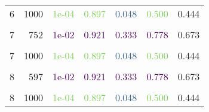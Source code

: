 \begin{table}
{\begin{tabular}[t]{rr>{}r>{}r>{}r>{}rr}
6 & 1000 & \textcolor[HTML]{7AD151}{1e-04} & \textcolor[HTML]{7AD151}{0.897} & \textcolor[HTML]{365C8D}{0.048} & \textcolor[HTML]{7AD151}{0.500} & 0.444\\
\cellcolor{gray!6}{7} & \cellcolor{gray!6}{158} & \textcolor[HTML]{443983}{\cellcolor{gray!6}{1e-01}} & \textcolor[HTML]{440154}{\cellcolor{gray!6}{0.916}} & \textcolor[HTML]{481F70}{\cellcolor{gray!6}{0.333}} & \textcolor[HTML]{46327E}{\cellcolor{gray!6}{0.700}} & \cellcolor{gray!6}{0.633}\\
7 & 752 & \textcolor[HTML]{440154}{1e-02} & \textcolor[HTML]{440154}{0.921} & \textcolor[HTML]{440154}{0.333} & \textcolor[HTML]{440154}{0.778} & 0.673\\
\cellcolor{gray!6}{7} & \cellcolor{gray!6}{1000} & \textcolor[HTML]{35B779}{\cellcolor{gray!6}{1e-03}} & \textcolor[HTML]{36B779}{\cellcolor{gray!6}{0.901}} & \textcolor[HTML]{482979}{\cellcolor{gray!6}{0.095}} & \textcolor[HTML]{24868E}{\cellcolor{gray!6}{0.667}} & \cellcolor{gray!6}{0.542}\\
7 & 1000 & \textcolor[HTML]{7AD151}{1e-04} & \textcolor[HTML]{7AD151}{0.897} & \textcolor[HTML]{365C8D}{0.048} & \textcolor[HTML]{7AD151}{0.500} & 0.444\\
\hline
\cellcolor{gray!6}{8} & \cellcolor{gray!6}{162} & \textcolor[HTML]{31688E}{\cellcolor{gray!6}{1e-01}} & \textcolor[HTML]{440154}{\cellcolor{gray!6}{0.911}} & \textcolor[HTML]{463480}{\cellcolor{gray!6}{0.333}} & \textcolor[HTML]{3A538B}{\cellcolor{gray!6}{0.636}} & \cellcolor{gray!6}{0.600}\\
8 & 597 & \textcolor[HTML]{440154}{1e-02} & \textcolor[HTML]{440154}{0.921} & \textcolor[HTML]{440154}{0.333} & \textcolor[HTML]{440154}{0.778} & 0.673\\
\cellcolor{gray!6}{8} & \cellcolor{gray!6}{1000} & \textcolor[HTML]{21908D}{\cellcolor{gray!6}{1e-03}} & \textcolor[HTML]{1F988B}{\cellcolor{gray!6}{0.906}} & \textcolor[HTML]{460B5E}{\cellcolor{gray!6}{0.143}} & \textcolor[HTML]{3A548C}{\cellcolor{gray!6}{0.750}} & \cellcolor{gray!6}{0.599}\\
8 & 1000 & \textcolor[HTML]{7AD151}{1e-04} & \textcolor[HTML]{7AD151}{0.897} & \textcolor[HTML]{365C8D}{0.048} & \textcolor[HTML]{7AD151}{0.500} & 0.444\\
\bottomrule
\end{tabular}}
\end{table}
